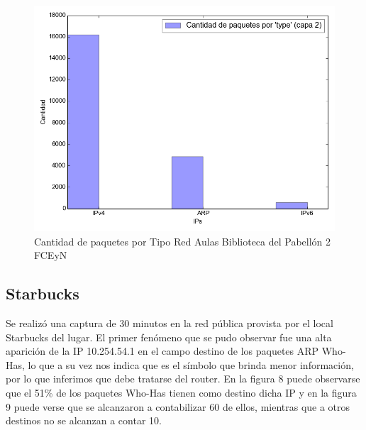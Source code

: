 \begin{center}
	\begin{figure}[ht]
    	\centering
		\includegraphics[width=12cm]{imgs/outputPabloRedAulasPab2_p-pkgs_by_type.png}
		\caption{Cantidad de paquetes por Tipo Red Aulas Biblioteca del Pabellón 2 FCEyN}
	\end{figure}
\end{center}





\FloatBarrier
\newpage
\subsection{Starbucks}

Se realizó una captura de 30 minutos en la red pública provista por el local Starbucks del lugar. El primer fenómeno que se pudo observar fue una alta aparición de la IP 10.254.54.1 en el campo destino de los paquetes ARP Who-Has, lo que a su vez nos indica que es el símbolo que brinda menor información, por lo que inferimos que debe tratarse del router. En la figura 8 puede observarse que el 51\% de los paquetes Who-Has tienen como destino dicha IP y en la figura 9 puede verse que se alcanzaron a contabilizar 60 de ellos, mientras que a otros destinos no se alcanzan a contar 10.

